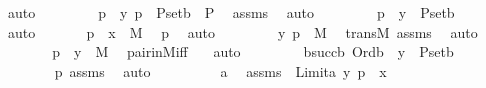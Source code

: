\begin{isabellebody}
\ auto\ \isanewline
\ \ \ \ \isamarkupfalse%
\ \isamarkupfalse%
\ p{}{}\ {\isacharcolon}{\kern0pt}\ {\isachardoublequoteopen}{\isacharless}{\kern0pt}y{\isacharcomma}{\kern0pt}\ p{\isachargreater}{\kern0pt}\ {\isasymin}\ P{\isacharunderscore}{\kern0pt}set{\isacharparenleft}{\kern0pt}b{\isacharparenright}{\kern0pt}\ {\isasymtimes}\ P{\isachardoublequoteclose}\ \isamarkupfalse%
\ assms\ \isamarkupfalse%
\ auto\ \isanewline
\ \ \ \ \isamarkupfalse%
\ \isamarkupfalse%
\ p{}{}\ {\isacharcolon}{\kern0pt}\ {\isachardoublequoteopen}y\ {\isasymin}\ P{\isacharunderscore}{\kern0pt}set{\isacharparenleft}{\kern0pt}b{\isacharparenright}{\kern0pt}{\isachardoublequoteclose}\ \isamarkupfalse%
\ auto\ \isanewline
\ \ \ \ \isamarkupfalse%
\ p{}\ {\isacharcolon}{\kern0pt}\ {\isachardoublequoteopen}x\ {\isasymin}\ M{\isachardoublequoteclose}\ \isamarkupfalse%
\ p{}\ \isamarkupfalse%
\ auto\ \isanewline
\ \ \ \ \isamarkupfalse%
\ \isamarkupfalse%
\ {\isachardoublequoteopen}{\isacharless}{\kern0pt}y{\isacharcomma}{\kern0pt}\ p{\isachargreater}{\kern0pt}\ {\isasymin}\ M{\isachardoublequoteclose}\ \isamarkupfalse%
\ transM\ assms\ \isamarkupfalse%
\ auto\ \isanewline
\ \ \ \ \isamarkupfalse%
\ \isamarkupfalse%
\ p{}\ {\isacharcolon}{\kern0pt}\ {\isachardoublequoteopen}y\ {\isasymin}\ M{\isachardoublequoteclose}\ \isamarkupfalse%
\ pair{\isacharunderscore}{\kern0pt}in{\isacharunderscore}{\kern0pt}M{\isacharunderscore}{\kern0pt}iff\ \ \isamarkupfalse%
\ auto\ \isanewline
\ \ \ \ \isamarkupfalse%
\ \isamarkupfalse%
\ {\isachardoublequoteopen}{\isasymexists}b{\isacharless}{\kern0pt}succ{\isacharparenleft}{\kern0pt}b{\isacharparenright}{\kern0pt}{\isachardot}{\kern0pt}\ Ord{\isacharparenleft}{\kern0pt}b{\isacharparenright}{\kern0pt}\ {\isasymand}\ y\ {\isasymin}\ P{\isacharunderscore}{\kern0pt}set{\isacharparenleft}{\kern0pt}b{\isacharparenright}{\kern0pt}{\isachardoublequoteclose}\ \isanewline
\ \ \ \ \ \ \isamarkupfalse%
\ p{}{}\ assms\ \isamarkupfalse%
\ auto\ \isanewline
\ \ \isamarkupfalse%
\isanewline
\ \ \ \ \isamarkupfalse%
\ a\ \isamarkupfalse%
\ assms\ {\isacharcolon}{\kern0pt}\ {\isachardoublequoteopen}Limit{\isacharparenleft}{\kern0pt}a{\isacharparenright}{\kern0pt}{\isachardoublequoteclose}\ {\isachardoublequoteopen}{\isasymlangle}y{\isacharcomma}{\kern0pt}\ p{\isasymrangle}\ {\isasymin}\ x{\isachardoublequoteclose}\ \isanewline

\end{isabellebody}

